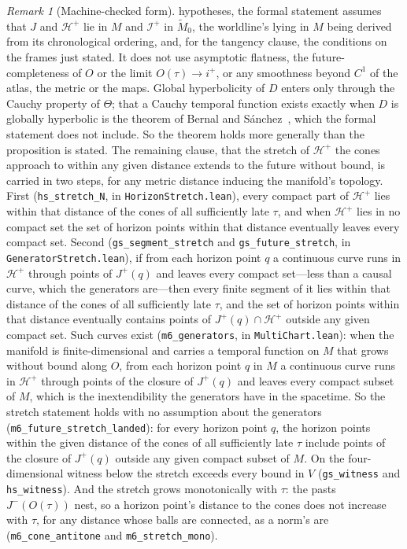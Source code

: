 \documentclass[11pt,a4paper]{article}
\theoremstyle{plain}
\theoremstyle{remark}
\newtheorem{remark}{Remark}
\begin{document}
\begin{remark}[Machine-checked form]
hypotheses, the formal statement assumes that $J$ and $\mathcal{H}^+$ lie in $M$ and $\mathscr{I}^+$ in $\tilde M_0$, the worldline's lying in $M$ being derived from its chronological ordering, and, for the tangency clause, the conditions on the frames just stated. It does not use asymptotic flatness, the future-completeness of $O$ or the limit $O(\tau)\to i^+$, or any smoothness beyond $C^{1}$ of the atlas, the metric or the maps. Global hyperbolicity of $D$ enters only through the Cauchy property of $\Theta$; that a Cauchy temporal function exists exactly when $D$ is globally hyperbolic is the theorem of Bernal and S\'anchez~\cite{BernalSanchez2005}, which the formal statement does not include. So the theorem holds more generally than the proposition is stated. The remaining clause, that the stretch of $\mathcal{H}^+$ the cones approach to within any given distance extends to the future without bound, is carried in two steps, for any metric distance inducing the manifold's topology. First (\texttt{hs\_stretch\_N}, in \texttt{HorizonStretch.lean}), every compact part of $\mathcal{H}^+$ lies within that distance of the cones of all sufficiently late $\tau$, and when $\mathcal{H}^+$ lies in no compact set the set of horizon points within that distance eventually leaves every compact set. Second (\texttt{gs\_segment\_stretch} and \texttt{gs\_future\_stretch}, in \texttt{GeneratorStretch.lean}), if from each horizon point $q$ a continuous curve runs in $\mathcal{H}^+$ through points of $J^+(q)$ and leaves every compact set---less than a causal curve, which the generators are---then every finite segment of it lies within that distance of the cones of all sufficiently late $\tau$, and the set of horizon points within that distance eventually contains points of $J^+(q)\cap\mathcal{H}^+$ outside any given compact set. Such curves exist (\texttt{m6\_generators}, in \texttt{MultiChart.lean}): when the manifold is finite-dimensional and carries a temporal function on $M$ that grows without bound along $O$, from each horizon point $q$ in $M$ a continuous curve runs in $\mathcal{H}^+$ through points of the closure of $J^+(q)$ and leaves every compact subset of $M$, which is the inextendibility the generators have in the spacetime. So the stretch statement holds with no assumption about the generators (\texttt{m6\_future\_stretch\_landed}): for every horizon point $q$, the horizon points within the given distance of the cones of all sufficiently late $\tau$ include points of the closure of $J^+(q)$ outside any given compact subset of $M$. On the four-dimensional witness below the stretch exceeds every bound in $V$ (\texttt{gs\_witness} and \texttt{hs\_witness}). And the stretch grows monotonically with $\tau$: the pasts $J^-(O(\tau))$ nest, so a horizon point's distance to the cones does not increase with $\tau$, for any distance whose balls are connected, as a norm's are (\texttt{m6\_cone\_antitone} and \texttt{m6\_stretch\_mono}).


\end{remark}
\end{document}
